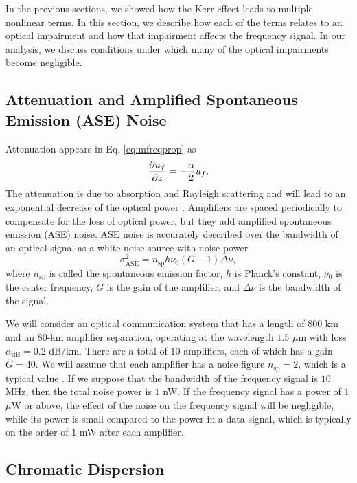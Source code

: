 In the previous sections, we showed how the Kerr effect leads to multiple nonlinear terms. In this section, we describe how each of the terms relates to an optical impairment and how that impairment affects the frequency signal. In our analysis, we discuss conditions under which many of the optical impairments become negligible.

\subsection{Attenuation and Amplified Spontaneous Emission (ASE) Noise}
%
Attenuation appears in Eq. \ref{eq:mfreqprop} as
%
\begin{equation}
\frac{\partial u_f}{\partial z} = -\frac{\alpha}{2}u_f.
\end{equation}
%
The attenuation is due to absorption and Rayleigh scattering and will lead to an exponential decrease of the optical power \cite{agrawal2012fiber}. Amplifiers are spaced periodically to compensate for the loss of optical power, but they add amplified spontaneous emission (ASE) noise. ASE noise is accurately described over the bandwidth of an optical signal as a white noise source with noise power \cite{agrawal2012fiber}
%
\begin{equation}
\sigma^2_{\text{ASE}} = n_{\text{sp}}h\nu_0 (G-1)\Delta\nu,
\end{equation}
%
where $n_{\text{sp}}$ is called the spontaneous emission factor, $h$ is Planck's constant, $\nu_0$ is the center frequency, $G$ is the gain of the amplifier, and $\Delta\nu$ is the bandwidth of the signal. 

We will consider an optical communication system that has a length of $800$ km and an $80$-km amplifier separation, operating at the wavelength $1.5$ $\mu$m with loss $\alpha_{\text{dB}} = 0.2$ dB/km. There are a total of $10$ amplifiers, each of which has a gain $G=40$. We will assume that each amplifier has a noise figure $n_{\text{sp}} = 2$, which is a typical value \cite{agrawal2012fiber}. If we suppose that the bandwidth of the frequency signal is $10$ MHz, then the total noise power is $1$ nW. If the frequency signal has a power of $1$ $\mu$W or above, the effect of the noise on the frequency signal will be negligible, while its power is small compared to the power in a data signal, which is typically on the order of $1$ mW after each amplifier.

\subsection{Chromatic Dispersion}

